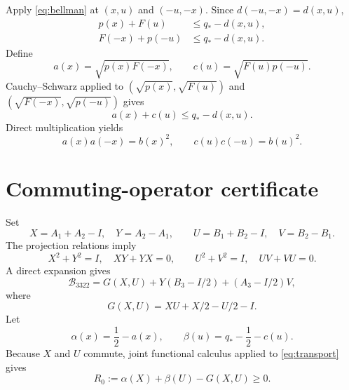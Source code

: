\documentclass[11pt]{article}
\newcommand{\B}{\mathcal B_{3322}}
\newcommand{\id}{I}
\begin{document}
Apply \eqref{eq:bellman} at $(x,u)$ and $(-u,-x)$.  Since
$d(-u,-x)=d(x,u)$,
\begin{equation}
\begin{split}
p(x)+F(u)&\le q_*-d(x,u),\\
F(-x)+p(-u)&\le q_*-d(x,u).
\end{split}                                         \label{eq:twoBellman}
\end{equation}
Define
\begin{equation}
a(x)=\sqrt{p(x)F(-x)},
\qquad
c(u)=\sqrt{F(u)p(-u)}.                              \label{eq:ac}
\end{equation}
Cauchy--Schwarz applied to
$(\sqrt{p(x)},\sqrt{F(u)})$ and
$(\sqrt{F(-x)},\sqrt{p(-u)})$ gives
\begin{equation}
a(x)+c(u)\le q_*-d(x,u).                            \label{eq:transport}
\end{equation}
Direct multiplication yields
\begin{equation}
a(x)a(-x)=b(x)^2,
\qquad
c(u)c(-u)=b(u)^2.                                   \label{eq:products}
\end{equation}

\section{Commuting-operator certificate}

Set
\begin{equation}
X=A_1+A_2-\id,\quad Y=A_2-A_1,
\qquad
U=B_1+B_2-\id,\quad V=B_2-B_1.                     \label{eq:XYUV}
\end{equation}
The projection relations imply
\begin{equation}
X^2+Y^2=\id,\quad XY+YX=0,
\qquad
U^2+V^2=\id,\quad UV+VU=0.                         \label{eq:csrels}
\end{equation}
A direct expansion gives
\begin{equation}
\B=G(X,U)+Y(B_3-\id/2)+(A_3-\id/2)V,               \label{eq:reparam}
\end{equation}
where
\[
G(X,U)=XU+X/2-U/2-\id.
\]
Let
\[
\alpha(x)=\frac12-a(x),
\qquad
\beta(u)=q_*-\frac12-c(u).
\]
Because $X$ and $U$ commute, joint functional calculus applied to
\eqref{eq:transport} gives
\begin{equation}
R_0:=\alpha(X)+\beta(U)-G(X,U)\ge0.                 \label{eq:R0}
\end{equation}
\end{document}
